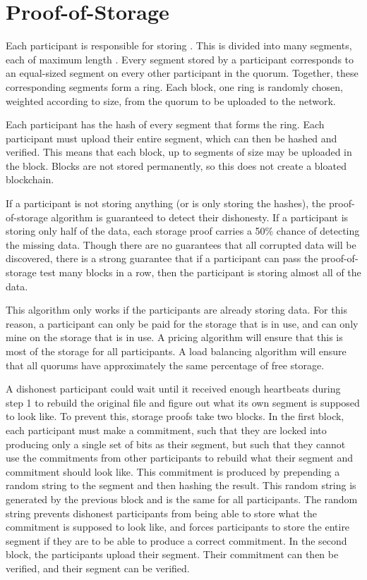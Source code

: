 \documentclass[twocolumn]{article}
\begin{document}
\section{Proof-of-Storage}
Each participant is responsible for storing \participantvolume{}.
This \participantvolume{} is divided into many segments, each of maximum length \maxsegmentsize{}.
Every segment stored by a participant corresponds to an equal-sized segment on every other participant in the quorum.
Together, these corresponding segments form a ring.
Each block, one ring is randomly chosen, weighted according to size, from the quorum to be uploaded to the network.

Each participant has the hash of every segment that forms the ring.
Each participant must upload their entire segment, which can then be hashed and verified.
This means that each block, up to \quorumsize{} segments of size \maxsegmentsize{} may be uploaded in the block.
Blocks are not stored permanently, so this does not create a bloated blockchain.

If a participant is not storing anything (or is only storing the hashes), the proof-of-storage algorithm is guaranteed to detect their dishonesty.
If a participant is storing only half of the data, each storage proof carries a 50\% chance of detecting the missing data.
Though there are no guarantees that all corrupted data will be discovered, there is a strong guarantee that if a participant can pass the proof-of-storage test many blocks in a row, then the participant is storing almost all of the data.

This algorithm only works if the participants are already storing data.
For this reason, a participant can only be paid for the storage that is in use, and can only mine on the storage that is in use.
A pricing algorithm will ensure that this is most of the storage for all participants.
A load balancing algorithm will ensure that all quorums have approximately the same percentage of free storage.

A dishonest participant could wait until it received enough heartbeats during step 1 to rebuild the original file and figure out what its own segment is supposed to look like.
To prevent this, storage proofs take two blocks.
In the first block, each participant must make a commitment, such that they are locked into producing only a single set of bits as their segment, but such that they cannot use the commitments from other participants to rebuild what their segment and commitment should look like.
This commitment is produced by prepending a random string to the segment and then hashing the result.
This random string is generated by the previous block and is the same for all participants.
The random string prevents dishonest participants from being able to store what the commitment is supposed to look like, and forces participants to store the entire segment if they are to be able to produce a correct commitment.
In the second block, the participants upload their segment.
Their commitment can then be verified, and their segment can be verified.
\end{document}
